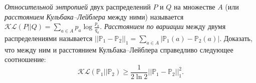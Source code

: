 \begin{comment}
\begin{remark}
О связи совместная информации $I(x,y)$ и пропускной способности канала.  
\end{remark}

\begin{problem} \textit{Случайные коды.}
\end{problem}


\begin{remark} Стоит ли писать что на этом подходе основывается построение кодов оптимальной длины?
\end{remark}

\end{comment}

\begin{problem} 
\label{KL}
\textit{Относительной энтропией} двух распределений $P$ и $Q$ на множестве $A$ (или \textit{расстоянием Кульбака--Лейблера} между ними) называется
$\mathcal{KL}(P||Q) = \sum_{a \in A} p_a \log \frac{p_a}{q_a}$. 
\textit{Расстоянием по вариации} между двумя распределениями называется $||\mathbb{P}_1 - \mathbb{P}_2||_1 = \sum_{a \in A} |\mathbb{P}_1(a) - \mathbb{P}_2(a)|$. Доказать, что между ним и расстоянием Кульбака--Лейблера справедливо следующее соотношение:
$$\mathcal{KL}(\mathbb{P}_1||\mathbb{P}_2) \geq \frac{1}{2\ln2} ||\mathbb{P}_1 - \mathbb{P}_2||_1^2.$$
\end{problem}

